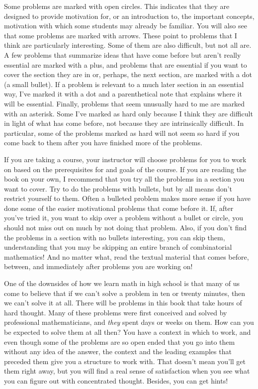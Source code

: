 \documentclass[10pt,]{book}
\theoremstyle{plain}
\theoremstyle{definition}
\theoremstyle{definition}
\numberwithin{equation}{chapter}
\begin{document}
Some problems are marked with open circles. This indicates that they are designed to provide motivation for, or an introduction to, the important concepts, motivation with which some students may already be familiar. You will also see that some problems are marked with arrows. These point to problems that I think are particularly interesting. Some of them are also difficult, but not all are. A few problems that summarize ideas that have come before but aren't really essential are marked with a plus, and problems that are essential if you want to cover the section they are in or, perhaps, the next section, are marked with a dot (a small bullet). If a problem is relevant to a much later section in an essential way, I've marked it with a dot and a parenthetical note that explains where it will be essential. Finally, problems that seem unusually hard to me are marked with an asterisk. Some I've marked as hard only because I think they are difficult in light of what has come before, not because they are intrinsically difficult. In particular, some of the problems marked as hard will not seem so hard if you come back to them after you have finished more of the problems.%
\par
\hypertarget{p-12}{}%
If you are taking a course, your instructor will choose problems for you to work on based on the prerequisites for and goals of the course. If you are reading the book on your own, I recommend that you try all the problems in a section you want to cover. Try to do the problems with bullets, but by all means don't restrict yourself to them. Often a bulleted problem makes more sense if you have done some of the easier motivational problems that come before it. If, after you've tried it, you want to skip over a problem without a bullet or circle, you should not miss out on much by not doing that problem. Also, if you don't find the problems in a section with no bullets interesting, you can skip them, understanding that you may be skipping an entire branch of combinatorial mathematics! And no matter what, read the textual material that comes before, between, and immediately after problems you are working on!%
\par
\hypertarget{p-13}{}%
One of the downsides of how we learn math in high school is that many of us come to believe that if we can't solve a problem in ten or twenty minutes, then we can't solve it at all.  There will be problems in this book that take hours of hard thought.  Many of these problems were first conceived and solved by professional mathematicians, and \emph{they} spent days or weeks on them. How can you be expected to solve them at all then? You have a context in which to work, and even though some of the problems are so open ended that you go into them without any idea of the answer, the context and the leading examples that preceded them give you a structure to work with. That doesn't mean you'll get them right away, but you will find a real sense of satisfaction when you see what you can figure out with concentrated thought. Besides, you can get hints!%
\end{document}
